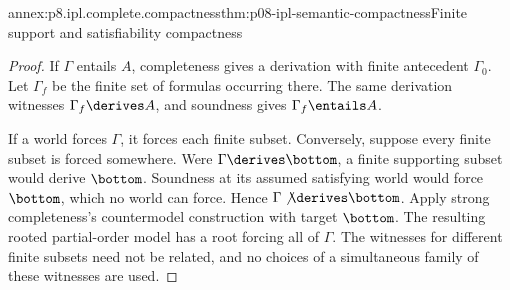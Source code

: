 \begin{annexitem}{annex:p8.ipl.complete.compactness}{thm:p08-ipl-semantic-compactness}{Finite support and satisfiability compactness}
\begin{proof}
If \(\Gamma\) entails \(A\), completeness gives a derivation with
finite antecedent \(\Gamma_0\). Let \(\Gamma_f\) be the finite
set of formulas occurring there. The same derivation witnesses
\(\Gamma_f\derives A\), and soundness gives \(\Gamma_f\entails A\).

If a world forces \(\Gamma\), it forces each finite subset.
Conversely, suppose every finite subset is forced somewhere. Were
\(\Gamma\derives\bottom\), a finite supporting subset would
derive \(\bottom\). Soundness at its assumed satisfying world would
force \(\bottom\), which no world can force. Hence
\(\Gamma\not\derives\bottom\). Apply strong completeness's
countermodel construction with target \(\bottom\). The resulting
rooted partial-order model has a root forcing all of \(\Gamma\).
The witnesses for different finite subsets need not be related, and no
choices of a simultaneous family of these witnesses are used.
\end{proof}
\end{annexitem}

